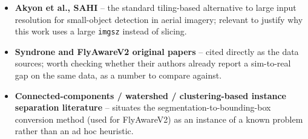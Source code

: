 \documentclass[11pt]{article}
\begin{document}
\begin{itemize}
    place VisDrone among them.
    \item \textbf{Akyon et al., SAHI} -- the standard tiling-based alternative to large input
    resolution for small-object detection in aerial imagery; relevant to justify why this work
    uses a large \texttt{imgsz} instead of slicing.
    \item \textbf{Syndrone and FlyAwareV2 original papers} -- cited directly as the data
    sources; worth checking whether their authors already report a sim-to-real gap on the same
    data, as a number to compare against.
    \item \textbf{Connected-components / watershed / clustering-based instance separation
    literature} -- situates the segmentation-to-bounding-box conversion method (used for
    FlyAwareV2) as an instance of a known problem rather than an ad hoc heuristic.
\end{itemize}
\end{document}
